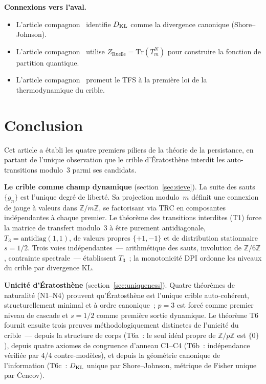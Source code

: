 \documentclass[12pt,a4paper]{article}
\begin{document}
\medskip\noindent\textbf{Connexions vers l'aval.}
\begin{itemize}
\item L'article compagnon~\cite{companion_M2} identifie $D_{\mathrm{KL}}$ comme
  la divergence canonique (Shore--Johnson).
\item L'article compagnon~\cite{companion_M5} utilise
  $Z_{\mathrm{Ruelle}} = \mathrm{Tr}(T_m^N)$ pour construire la
  fonction de partition quantique.
\item L'article compagnon~\cite{companion_M5} promeut le TFS à la
  première loi de la thermodynamique du crible.
\end{itemize}


\section{Conclusion}
\label{sec:conclusion}

Cet article a établi les quatre premiers piliers de la théorie de la
persistance, en partant de l'unique observation que le crible
d'Ératosthène interdit les auto-transitions modulo~3 parmi ses
candidats.

\textbf{Le crible comme champ dynamique} (section~\ref{sec:sieve}).
La suite des sauts $\{g_n\}$ est l'unique degré de liberté. Sa
projection modulo~$m$ définit une connexion de jauge à valeurs dans
$\mathbb{Z}/m\mathbb{Z}$, se factorisant via TRC en composantes
indépendantes à chaque premier. Le théorème des transitions
interdites (T1) force la matrice de transfert modulo~3 à être
purement antidiagonale, $T_3 = \mathrm{antidiag}(1,1)$, de valeurs
propres $\{+1,-1\}$ et de distribution stationnaire $s = 1/2$. Trois
voies indépendantes~--- arithmétique des sauts, involution de
$\mathbb{Z}/6\mathbb{Z}$, contrainte spectrale~--- établissent $T_3$~;
la monotonicité DPI ordonne les niveaux du crible par divergence KL.

\textbf{Unicité d'Ératosthène} (section~\ref{sec:uniqueness}).
Quatre théorèmes de naturalité (N1--N4) prouvent qu'Ératosthène est
l'unique crible auto-cohérent, structurellement minimal et à ordre
canonique~; $p = 3$ est forcé comme premier niveau de cascade et
$s = 1/2$ comme première sortie dynamique. Le théorème T6 fournit
ensuite trois preuves méthodologiquement distinctes de l'unicité du
crible~--- depuis la structure de corps (T6a~: le seul idéal propre de
$\mathbb{Z}/p\mathbb{Z}$ est $\{0\}$), depuis quatre axiomes de
congruence d'anneau C1--C4 (T6b~: indépendance vérifiée par 4/4
contre-modèles), et depuis la géométrie canonique de l'information
(T6c~: $D_{\mathrm{KL}}$ unique par Shore--Johnson, métrique de Fisher unique
par \v{C}encov).
\end{document}
